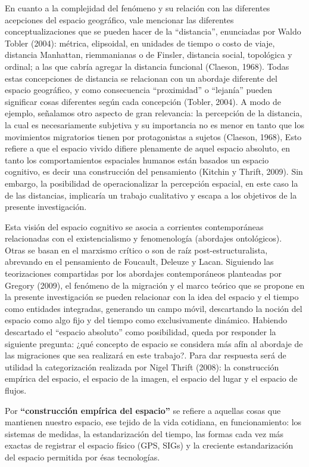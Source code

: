 \documentclass[12pt,spanish,]{article}
\begin{document}
En cuanto a la complejidad del fenómeno y su relación con las diferentes
acepciones del espacio geográfico, vale mencionar las diferentes
conceptualizaciones que se pueden hacer de la ``distancia'', enunciadas
por Waldo Tobler (2004): métrica, elipsoidal, en unidades de tiempo o
costo de viaje, distancia Manhattan, riemmanianas o de Finsler,
distancia social, topológica y ordinal; a las que cabría agregar la
distancia funcional (Claeson, 1968). Todas estas concepciones de
distancia se relacionan con un abordaje diferente del espacio
geográfico, y como consecuencia ``proximidad'' o ``lejanía'' pueden
significar cosas diferentes según cada concepción (Tobler, 2004). A modo
de ejemplo, señalamos otro aspecto de gran relevancia: la percepción de
la distancia, la cual es necesariamente subjetiva y su importancia no es
menor en tanto que los movimientos migratorios tienen por protagonistas
a sujetos (Claeson, 1968), Esto refiere a que el espacio vivido difiere
plenamente de aquel espacio absoluto, en tanto los comportamientos
espaciales humanos están basados un espacio cognitivo, es decir una
construcción del pensamiento (Kitchin y Thrift, 2009). Sin embargo, la
posibilidad de operacionalizar la percepción espacial, en este caso la
de las distancias, implicaría un trabajo cualitativo y escapa a los
objetivos de la presente investigación.

Esta visión del espacio cognitivo se asocia a corrientes contemporáneas
relacionadas con el existencialismo y fenomenología (abordajes
ontológicos). Otras se basan en el marxismo crítico o son de raíz
post-estructuralista, abrevando en el pensamiento de Foucault, Deleuze y
Lacan. Siguiendo las teorizaciones compartidas por los abordajes
contemporáneos planteadas por Gregory (2009), el fenómeno de la
migración y el marco teórico que se propone en la presente investigación
se pueden relacionar con la idea del espacio y el tiempo como entidades
integradas, generando un campo móvil, descartando la noción del espacio
como algo fijo y del tiempo como exclusivamente dinámico. Habiendo
descartado el ``espacio absoluto'' como posibilidad, queda por responder
la siguiente pregunta: ¿qué concepto de espacio se considera más afín al
abordaje de las migraciones que sea realizará en este trabajo?. Para dar
respuesta será de utilidad la categorización realizada por Nigel Thrift
(2008): la construcción empírica del espacio, el espacio de la imagen,
el espacio del lugar y el espacio de flujos.

Por \textbf{``construcción empírica del espacio''} se refiere a aquellas
cosas que mantienen nuestro espacio, ese tejido de la vida cotidiana, en
funcionamiento: los sistemas de medidas, la estandarización del tiempo,
las formas cada vez más exactas de registrar el espacio físico (GPS,
SIGs) y la creciente estandarización del espacio permitida por ésas
tecnologías.
\end{document}
